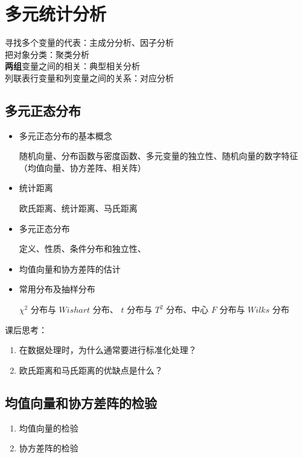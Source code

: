 \documentclass[UTF8,10pt]{book}
\begin{document}
{\clearpage
\chapter{多元统计分析}

寻找多个变量的代表：主成分分析、因子分析\\

把对象分类：聚类分析\\

\textbf{两组}变量之间的相关：典型相关分析\\

列联表行变量和列变量之间的关系：对应分析

\section{多元正态分布}\label{header-n2}

\begin{itemize}
	\item
	多元正态分布的基本概念
	
	随机向量、分布函数与密度函数、多元变量的独立性、随机向量的数字特征（均值向量、协方差阵、相关阵）
	\item
	统计距离
	
	欧氏距离、统计距离、马氏距离
	\item
	多元正态分布
	
	定义、性质、条件分布和独立性、
	\item
	均值向量和协方差阵的估计
	\item
	常用分布及抽样分布
	
	\(\chi^2\) 分布与 \(Wishart\) 分布、 \(t\) 分布与 \(T^2\) 分布、中心
	\(F\) 分布与 \(Wilks\) 分布
\end{itemize}

课后思考：

\begin{enumerate}
	\def\labelenumi{\arabic{enumi}.}
	\item
	在数据处理时，为什么通常要进行标准化处理？
	\item
	欧氏距离和马氏距离的优缺点是什么？
\end{enumerate}

\section{均值向量和协方差阵的检验}\label{header-n25}

\begin{enumerate}
	\def\labelenumi{\arabic{enumi}.}
	\item
	均值向量的检验
	\item
	协方差阵的检验
\end{enumerate}

}
\end{document}
